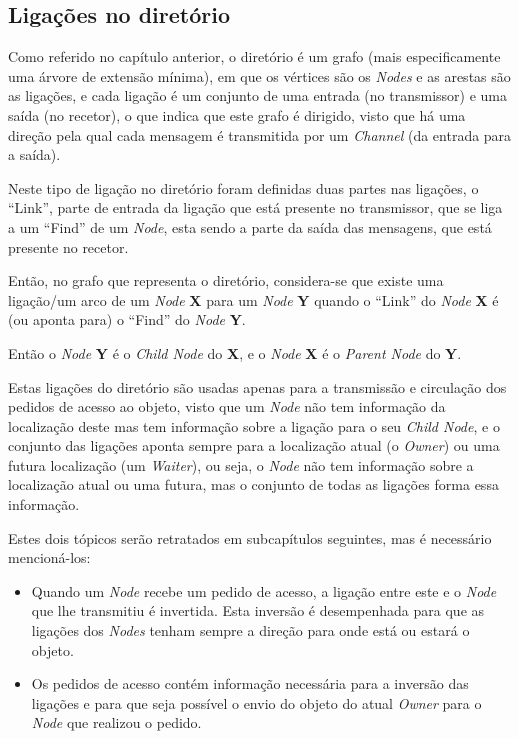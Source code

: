 \subsection*{Ligações no diretório}

Como referido no capítulo anterior, o diretório é um grafo (mais especificamente uma árvore de extensão mínima), em que os vértices são os \emph{Nodes} e as arestas são as ligações, e cada ligação é um conjunto de uma entrada (no transmissor) e uma saída (no recetor), o que indica que este grafo é dirigido, visto que há uma direção pela qual cada mensagem é transmitida por um \emph{Channel} (da entrada para a saída).

Neste tipo de ligação no diretório foram definidas duas partes nas ligações, o ``Link'', parte de entrada da ligação que está presente no transmissor, que se liga a um ``Find'' de um \emph{Node}, esta sendo a parte da saída das mensagens, que está presente no recetor.

Então, no grafo que representa o diretório, considera-se que existe uma ligação/um arco de um \emph{Node} \textbf{X} para um \emph{Node} \textbf{Y} quando o ``Link'' do 
\emph{Node} \textbf{X}  é (ou aponta para) o ``Find'' do \emph{Node} \textbf{Y}.

Então o \emph{Node} \textbf{Y} é o \emph{Child Node} do \textbf{X}, e o \emph{Node} \textbf{X} é o \emph{Parent Node} do \textbf{Y}.

Estas ligações do diretório são usadas apenas para a transmissão e circulação dos pedidos de acesso ao objeto, visto que um \emph{Node} não tem informação da localização deste mas tem informação sobre a ligação para o seu \emph{Child Node},
e o conjunto das ligações aponta sempre para a localização atual (o \emph{Owner}) ou uma futura localização (um \emph{Waiter}), ou seja, o \emph{Node} não tem informação sobre a localização atual ou uma futura, mas o conjunto de todas as ligações forma essa informação.

Estes dois tópicos serão retratados em subcapítulos seguintes, mas é necessário mencioná-los:
\begin{itemize}
    \item Quando um \emph{Node} recebe um pedido de acesso, a ligação entre este e o \emph{Node} que lhe transmitiu é invertida. Esta inversão é desempenhada para que as ligações dos \emph{Nodes} tenham sempre a direção para onde está ou estará o objeto.

    \item Os pedidos de acesso contém informação necessária para a inversão das ligações e para que seja possível o envio do objeto do atual \emph{Owner} para o \emph{Node} que realizou o pedido.
\end{itemize}

